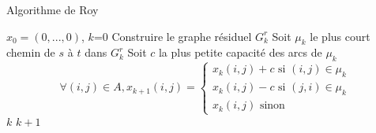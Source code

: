 \begin{frame}{Algorithme de Roy}
\label{alg:roy}
\begin{algorithmic}
    \State $x_0 = (0,...,0)$, $k$=0 
    \State Construire le graphe résiduel $G_k^r$
        \State Soit $\mu_k$ le plus court chemin de $s$ à $t$ dans $G_k^r$
        \State Soit $c$ la plus petite capacité des arcs de $\mu_k$ 
        \State $$\forall (i,j) \in A, x_{k+1}(i,j) = \left\{ 
            \begin{array}{l}
                x_k(i,j)+c \textrm{ si } (i,j) \in \mu_k \\
                x_k(i,j)-c \textrm{ si } (j,i) \in \mu_k \\
                x_k(i,j) \textrm{ sinon}
            \end{array}
            \right. $$
        \State $k$ \gets $k+1$
    \EndWhile
\end{algorithmic}
\end{frame}



